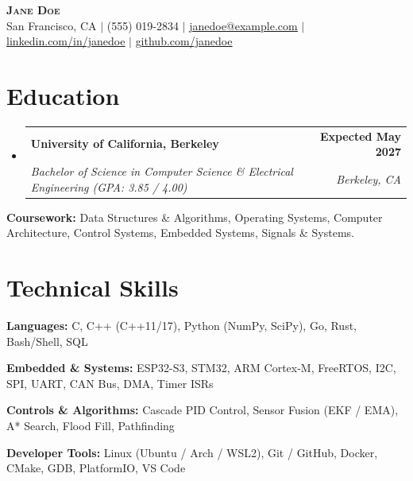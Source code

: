 \documentclass[letterpaper,10pt]{article}
\makeatletter
\newcommand{\resumeSubheading}[4]{
  \vspace{-2pt}\item
    \begin{tabular*}{0.98\textwidth}[t]{l@{\extracolsep{\fill}}r}
      \textbf{#1} & \textbf{\small #2} \\
      \textit{\small#3} & \textit{\small #4} \\
    \end{tabular*}\vspace{-6pt}
}
\newcommand{\resumeSubHeadingListStart}{\begin{itemize}[leftmargin=*,label={}]}
\newcommand{\resumeSubHeadingListEnd}{\end{itemize}\vspace{-6pt}}
\makeatother
\begin{document}
\begin{center}
    {\Huge \scshape \textbf{Jane Doe}} \\ \vspace{2pt}
    \small San Francisco, CA $|$ (555) 019-2834 $|$ \href{mailto:janedoe@example.com}{\underline{janedoe@example.com}} $|$ \href{https://linkedin.com/in/janedoe}{\underline{linkedin.com/in/janedoe}} $|$ \href{https://github.com/janedoe}{\underline{github.com/janedoe}}
\end{center}
\vspace{-12pt}

\section{Education}
  \resumeSubHeadingListStart
    \resumeSubheading
      {University of California, Berkeley}{Expected May 2027}
      {Bachelor of Science in Computer Science \& Electrical Engineering (GPA: 3.85 / 4.00)}{Berkeley, CA}
  \resumeSubHeadingListEnd
  \vspace{-4pt}
  \small{\textbf{Coursework:} Data Structures \& Algorithms, Operating Systems, Computer Architecture, Control Systems, Embedded Systems, Signals \& Systems.}
  \vspace{2pt}

\section{Technical Skills}
 \begin{itemize}[leftmargin=*, label=\textbullet, itemsep=-2pt, topsep=0pt, parsep=0pt, partopsep=0pt]
    \small{
    \item \textbf{Languages:} C, C++ (C++11/17), Python (NumPy, SciPy), Go, Rust, Bash/Shell, SQL
    \item \textbf{Embedded \& Systems:} ESP32-S3, STM32, ARM Cortex-M, FreeRTOS, I2C, SPI, UART, CAN Bus, DMA, Timer ISRs
    \item \textbf{Controls \& Algorithms:} Cascade PID Control, Sensor Fusion (EKF / EMA), A* Search, Flood Fill, Pathfinding
    \item \textbf{Developer Tools:} Linux (Ubuntu / Arch / WSL2), Git / GitHub, Docker, CMake, GDB, PlatformIO, VS Code
    }
 \end{itemize}
 \vspace{-4pt}

\end{document}
